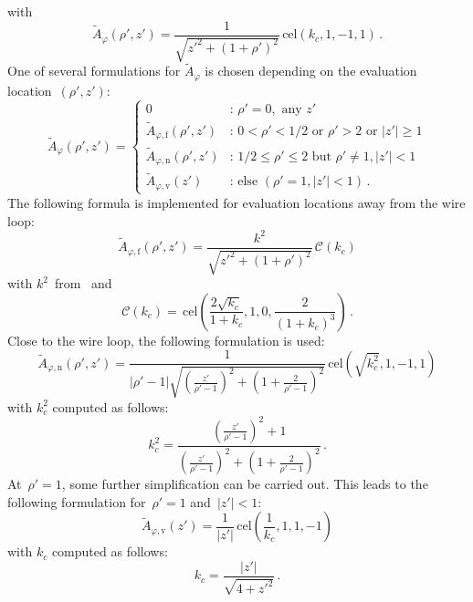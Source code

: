 with
\begin{equation}
  \tilde{A}_\varphi(\rho',z')
  = \frac{1}{\sqrt{z'^2 + (1 + \rho')^2}} \,\mathrm{cel}(k_c, 1, -1, 1) \, .
\end{equation}
One of several formulations for $\tilde{A}_\varphi$ is chosen depending on the evaluation location~$(\rho', z')$:
\begin{equation}
  \tilde{A}_\varphi (\rho', z') =
  \begin{cases}
    0                                          &:\, \rho' = 0 , \textrm{ any } z' \\
    \tilde{A}_{\varphi,\mathrm{f}} (\rho', z') &:\, 0 < \rho' < 1/2 \textrm{ or } \rho' > 2 \textrm{ or } |z'| \geq 1 \\
    \tilde{A}_{\varphi,\mathrm{n}} (\rho', z') &:\, 1/2 \leq \rho' \leq 2 \textrm{ but } \rho' \neq 1, |z'| < 1 \\
    \tilde{A}_{\varphi,\mathrm{v}} (z')        &:\, \textrm{else } (\rho' = 1, |z'| < 1) \, .
  \end{cases} \label{eqn:A_phi_final}
\end{equation}
The following formula is implemented for evaluation locations away from the wire loop:
\begin{equation}
  \tilde{A}_{\varphi,\mathrm{f}} (\rho',z')
  = \frac{k^2}{\sqrt{z'^2 + (1 + \rho')^2}} \,\mathcal{C}(k_c) \label{eqn:cwl_A_phi_f}
\end{equation}
with $k^2$~from~ and
\begin{equation}
  \mathcal{C}(k_c)
  = \,\mathrm{cel} \left( \frac{2 \sqrt{k_c}}{1 + k_c}, 1, 0, \frac{2}{(1 + k_c)^3} \right) \, . \label{eqn:elliptic_c}
\end{equation}
Close to the wire loop, the following formulation is used:
\begin{equation}
  \tilde{A}_{\varphi,\mathrm{n}} (\rho',z')
  = \frac{1}{|\rho' - 1| \sqrt{\left( \frac{z'}{\rho'-1} \right)^2 + \left(1 + \frac{2}{\rho'-1} \right)^2 }}
    \,\mathrm{cel}(\sqrt{k_c^2}, 1, -1, 1) \label{eqn:cwl_A_phi_n}
\end{equation}
with $k_c^2$ computed as follows:
\begin{equation}
  k_c^2 = \frac{\left( \frac{z'}{\rho'-1} \right)^2 + 1}{\left( \frac{z'}{\rho'-1} \right)^2 + \left(1 + \frac{2}{\rho'-1} \right)^2} \, .
\end{equation}
At~$\rho' = 1$, some further simplification can be carried out.
This leads to the following formulation for~$\rho' = 1$ and~$|z'| < 1$:
\begin{equation}
  \tilde{A}_{\varphi,\mathrm{v}} (z') = \frac{1}{|z'|} \,\mathrm{cel}\left(\frac{1}{k_c}, 1, 1, -1\right) \label{eqn:cwl_A_phi_v}
\end{equation}
with $k_c$ computed as follows:
\begin{equation}
  k_c = \frac{|z'|}{\sqrt{4 + {z'}^2}} \, .
\end{equation}

